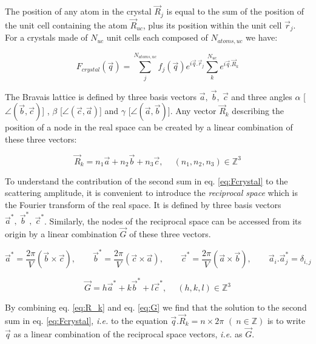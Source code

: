 The position of any atom in the crystal $\vec{R}_j$ is equal to the sum of the position of the unit cell containing the atom $\vec{R}_{uc}$, plus its position within the unit cell $\vec{r}_j$.
For a crystals made of $N_{uc}$ unit cells each composed of $N_{atoms,uc}$ we have:

\begin{equation}
    F_{crystal}(\vec{q}) = \sum_j^{N_{atoms,uc}} f_j(\vec{q}) e^{i\vec{q}.\vec{r}_j} \sum_k^{N_{uc}} e^{i\vec{q}.\vec{R}_k}
    \label{eq:Fcrystal}
\end{equation}

The Bravais lattice is defined by three basis vectors $\vec{a},\ \vec{b},\ \vec{c}$ and three angles $\alpha$ [$\angle (\vec{b}, \vec{c})$] , $\beta$ [$\angle (\vec{c}, \vec{a})$] and $\gamma$ [$\angle (\vec{a}, \vec{b})$].
Any vector $\vec{R}_k$ describing the position of a node in the real space can be created by a linear combination of these three vectors:

\begin{equation}
    \label{eq:R_k}
    \vec{R}_k=n_1\vec{a} + n_2\vec{b} + n_3\vec{c}, \quad \ (n_1,n_2,n_3) \in \mathbb{Z}^3
\end{equation}

To understand the contribution of the second sum in eq. \ref{eq:Fcrystal} to the scattering amplitude, it is convenient to introduce the \textit{reciprocal space} which is the Fourier transform of the real space.
It is defined by three basis vectors $\vec{a}^*,\ \vec{b}^*,\ \vec{c}^*$.
Similarly, the nodes of the reciprocal space can be accessed from its origin by a linear combination $\vec{G}$ of these three vectors.

\begin{equation}
    \vec{a}^*=\frac{2\pi}{V}(\vec{b}\times \vec{c}), \qquad
    \vec{b}^*=\frac{2\pi}{V}(\vec{c}\times \vec{a}), \qquad
    \vec{c}^*=\frac{2\pi}{V}(\vec{a}\times \vec{b}), \qquad
    \vec{a}_i . \vec{a}_j^* = \delta_{i,j}
\end{equation}

\begin{equation}
    \label{eq:G}
    \vec{G}=h\vec{a}^* + k\vec{b}^* + l\vec{c}^*, \quad \ (h,k,l) \in \mathbb{Z}^3
\end{equation}

By combining eq. \ref{eq:R_k} and eq. \ref{eq:G} we find that the solution to the second sum in eq. \ref{eq:Fcrystal}, \textit{i.e.} to the equation $\vec{q}.\vec{R}_k = n \times 2\pi$ $(\ n \in \mathbb{Z})$ is to write $\vec{q}$ as a linear combination of the reciprocal space vectors, \textit{i.e.} as $\vec{G}$.

